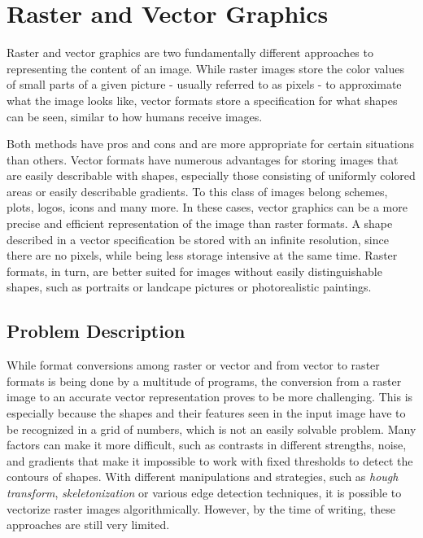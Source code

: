 \documentclass[12pt, a4paper, titlepage]{report}
\begin{document}
\section{Raster and Vector Graphics}

Raster and vector graphics are two fundamentally different approaches to representing the content of an image. While raster images store the color values of small parts of a given picture - usually referred to as pixels - to approximate what the image looks like, vector formats store a specification for what shapes can be seen, similar to how humans receive images.

Both methods have pros and cons and are more appropriate for certain situations than others.
Vector formats have numerous advantages for storing images that are easily describable with shapes, especially those consisting of uniformly colored areas or easily describable gradients. To this class of images belong schemes, plots, logos, icons and many more. In these cases, vector graphics can be a more precise and efficient representation of the image than raster formats. A shape described in a vector specification be stored with an infinite resolution, since there are no pixels, while being less storage intensive at the same time. Raster formats, in turn, are better suited for images without easily distinguishable shapes, such as portraits or landcape pictures or photorealistic paintings.

\subsection{Problem Description}

While format conversions among raster or vector and from vector to raster formats is being done by a multitude of programs, the conversion from a raster image to an accurate vector representation proves to be more challenging. This is especially because the shapes and their features seen in the input image have to be recognized in a grid of numbers, which is not an easily solvable problem. Many factors can make it more difficult, such as contrasts in different strengths, noise, and gradients that make it impossible to work with fixed thresholds to detect the contours of shapes. With different manipulations and strategies, such as \emph{hough transform}, \emph{skeletonization} or various edge detection techniques, it is possible to vectorize raster images algorithmically. However, by the time of writing, these approaches are still very limited.
\end{document}
